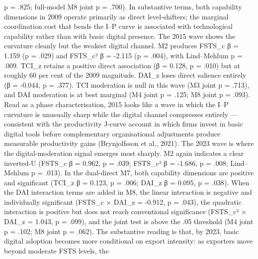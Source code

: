 \documentclass[12pt,a4paper]{article}
\begin{document}
p = .825; full-model M8 joint p = .700). In substantive terms, both
capability dimensions in 2009 operate primarily as direct
level-shifters; the marginal coordination cost that bends the I--P curve
is associated with technological capability rather than with basic
digital presence. The 2015 wave shows the curvature cleanly but the
weakest digital channel. M2 produces FSTS\_c β = 1.159 (p = .029) and
FSTS\_c² β = -2.115 (p = .004), with Lind--Mehlum p = .009. TCI\_z
retains a positive direct association (β = 0.128, p = .010) but at
roughly 60 per cent of the 2009 magnitude. DAI\_z loses direct salience
entirely (β = -0.044, p = .377). TCI moderation is null in this wave (M3
joint p = .713), and DAI moderation is at best marginal (M4 joint p =
.125; M8 joint p = .093). Read as a phase characterisation, 2015 looks
like a wave in which the I--P curvature is unusually sharp while the
digital channel compresses entirely --- consistent with the productivity
J-curve account in which firms invest in basic digital tools before
complementary organisational adjustments produce measurable productivity
gains (Brynjolfsson et al., 2021). The 2023 wave is where the
digital-moderation signal emerges most sharply. M2 again indicates a
clear inverted-U (FSTS\_c β = 0.962, p = .039; FSTS\_c² β = -1.686, p =
.008; Lind--Mehlum p = .013). In the dual-direct M7, both capability
dimensions are positive and significant (TCI\_z β = 0.123, p = .006;
DAI\_z β = 0.095, p = .038). When the DAI interaction terms are added in
M8, the linear interaction is negative and individually significant
(FSTS\_c × DAI\_z = -0.912, p = .043), the quadratic interaction is
positive but does not reach conventional significance (FSTS\_c² × DAI\_z
= 1.043, p = .099), and the joint test is above the .05 threshold (M4
joint p = .102; M8 joint p = .062). The substantive reading is that, by
2023, basic digital adoption becomes more conditional on export
intensity: as exporters move beyond moderate FSTS levels, the
\end{document}
